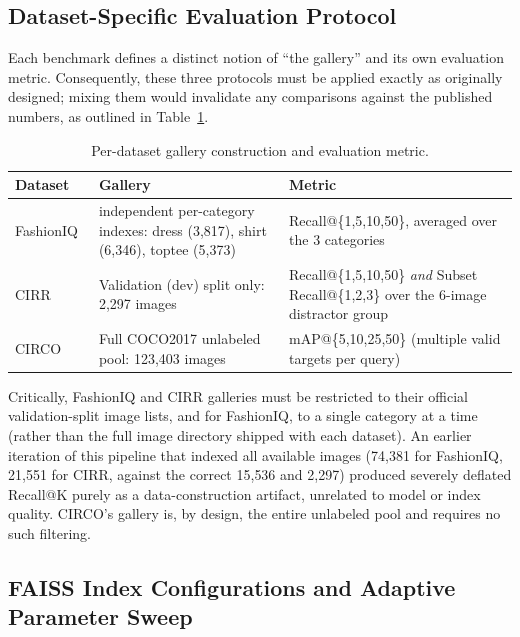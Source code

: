 \documentclass[conference]{IEEEtran}
\begin{document}
\subsection{Dataset-Specific Evaluation Protocol}
\label{subsec:protocol}

Each benchmark defines a distinct notion of ``the gallery'' and its own evaluation metric. Consequently, these three protocols must be applied exactly as originally designed; mixing them would invalidate any comparisons against the published numbers, as outlined in Table~\ref{tab:protocol}.

\begin{table}[!ht]
\caption{Per-dataset gallery construction and evaluation metric.}
\label{tab:protocol}
\renewcommand{\arraystretch}{0.8}
\begin{tabular}{>{\raggedright\arraybackslash}p{1.5cm} >{\raggedright\arraybackslash}p{3.2cm} >{\raggedright\arraybackslash}p{2.9cm}}
\toprule
\textbf{Dataset} & \textbf{Gallery} & \textbf{Metric} \\
\midrule
FashionIQ~\cite{wu2021fashion} & 3 independent per-category indexes: dress (3{,}817), shirt (6{,}346), toptee (5{,}373) & Recall@\{1,5,10,50\}, averaged over the 3 categories \\
CIRR~\cite{liu2021cirr} & Validation (dev) split only: 2{,}297 images & Recall@\{1,5,10,50\} \emph{and} Subset Recall@\{1,2,3\} over the 6-image distractor group \\
CIRCO~\cite{baldrati2023zero} & Full COCO2017 unlabeled pool: 123{,}403 images & mAP@\{5,10,25,50\} (multiple valid targets per query) \\
\bottomrule
\end{tabular}
\end{table}

Critically, FashionIQ and CIRR galleries must be restricted to their official validation-split image lists, and for FashionIQ, to a single category at a time (rather than the full image directory shipped with each dataset). An earlier iteration of this pipeline that indexed all available images (74{,}381 for FashionIQ, 21{,}551 for CIRR, against the correct 15{,}536 and 2{,}297) produced severely deflated Recall@K purely as a data-construction artifact, unrelated to model or index quality. CIRCO's gallery is, by design, the entire unlabeled pool and requires no such filtering.

\subsection{FAISS Index Configurations and Adaptive Parameter Sweep}
\label{subsec:sweep}
\end{document}
